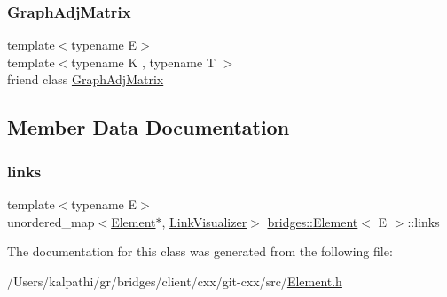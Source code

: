 \hypertarget{classbridges_1_1_element_ae8ba4af32b14c8ac8a3f8f861e914444}{}\label{classbridges_1_1_element_ae8ba4af32b14c8ac8a3f8f861e914444} 
\subsubsection{\texorpdfstring{Graph\+Adj\+Matrix}{GraphAdjMatrix}}
{\footnotesize\ttfamily template$<$typename E$>$ \\
template$<$typename K , typename T $>$ \\
friend class \hyperlink{classbridges_1_1_graph_adj_matrix}{Graph\+Adj\+Matrix}\hspace{0.3cm}{\ttfamily [friend]}}



\subsection{Member Data Documentation}
\hypertarget{classbridges_1_1_element_a6fb53728edc378f26238543b26238496}{}\label{classbridges_1_1_element_a6fb53728edc378f26238543b26238496} 
\subsubsection{\texorpdfstring{links}{links}}
{\footnotesize\ttfamily template$<$typename E$>$ \\
unordered\+\_\+map$<$\hyperlink{classbridges_1_1_element}{Element}$\ast$, \hyperlink{classbridges_1_1_link_visualizer}{Link\+Visualizer}$>$ \hyperlink{classbridges_1_1_element}{bridges\+::\+Element}$<$ E $>$\+::links\hspace{0.3cm}{\ttfamily [protected]}}



The documentation for this class was generated from the following file\+:\begin{DoxyCompactItemize}
\item 
/\+Users/kalpathi/gr/bridges/client/cxx/git-\/cxx/src/\hyperlink{_element_8h}{Element.\+h}\end{DoxyCompactItemize}
